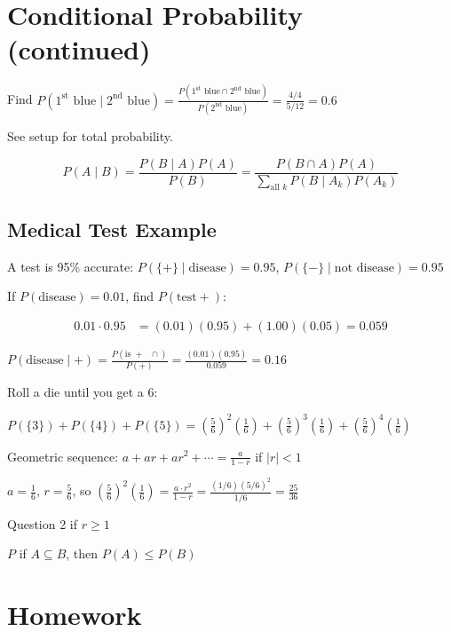 

\section{Conditional Probability (continued)}

Find $P(1^{\text{st}} \text{ blue} \mid 2^{\text{nd}} \text{ blue}) = \frac{P(1^{\text{st}} \text{ blue} \cap 2^{\text{nd}} \text{ blue})}{P(2^{\text{nd}} \text{ blue})} = \frac{4/4}{5/12} = 0.6$

See setup for total probability.

\begin{theorem}
\[P(A \mid B) = \frac{P(B \mid A)P(A)}{P(B)} = \frac{P(B \cap A)P(A)}{\sum_{\text{all } k} P(B \mid A_k)P(A_k)}\]
\end{theorem}

\subsection{Medical Test Example}

A test is 95\% accurate: $P(\{+\} \mid \text{disease}) = 0.95$, $P(\{-\} \mid \text{not disease}) = 0.95$

If $P(\text{disease}) = 0.01$, find $P(\text{test} +)$:

\begin{align*}
0.01 \cdot 0.95 &= (0.01)(0.95) + (1.00)(0.05) = 0.059
\end{align*}

$P(\text{disease} \mid +) = \frac{P(\text{is } + \text{ } \cap)}{P(+)} = \frac{(0.01)(0.95)}{0.059} = 0.16$

Roll a die until you get a 6:

$P(\{3\}) + P(\{4\}) + P(\{5\}) = \left(\frac{5}{6}\right)^2 \left(\frac{1}{6}\right) + \left(\frac{5}{6}\right)^3 \left(\frac{1}{6}\right) + \left(\frac{5}{6}\right)^4 \left(\frac{1}{6}\right)$

Geometric sequence: $a + ar + ar^2 + \cdots = \frac{a}{1-r}$ if $|r| < 1$

$a = \frac{1}{6}$, $r = \frac{5}{6}$, so $\left(\frac{5}{6}\right)^2 \left(\frac{1}{6}\right) = \frac{a \cdot r^2}{1 - r} = \frac{(1/6)(5/6)^2}{1/6} = \frac{25}{36}$

Question 2 if $r \geq 1$

$P$ if $A \subseteq B$, then $P(A) \leq P(B)$

\section{Homework}

